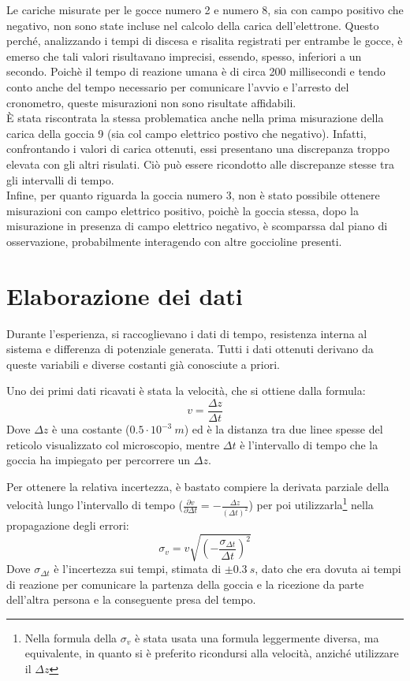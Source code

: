 \documentclass{article}
\begin{document}
Le cariche misurate per le gocce numero 2 e numero 8, sia con campo positivo che negativo, non sono state incluse nel calcolo della carica dell'elettrone. Questo perché, analizzando i tempi di discesa e risalita registrati per entrambe le gocce, è emerso che tali valori risultavano imprecisi, essendo, spesso, inferiori a un secondo. Poichè il tempo di reazione umana è di circa 200 millisecondi e tendo conto anche del tempo necessario per comunicare l'avvio e l'arresto del cronometro, queste misurazioni non sono risultate affidabili.\\

È stata riscontrata la stessa problematica anche nella prima misurazione della carica della goccia 9 (sia col campo elettrico postivo che negativo). Infatti, confrontando i valori di carica ottenuti, essi presentano una discrepanza troppo elevata con gli altri risulati. Ciò può essere ricondotto alle discrepanze stesse tra gli intervalli di tempo.\\

Infine, per quanto riguarda la goccia numero 3, non è stato possibile ottenere misurazioni con campo elettrico positivo, poichè la goccia stessa, dopo la misurazione in presenza di campo elettrico negativo, è scomparssa dal piano di osservazione, probabilmente interagendo con altre goccioline presenti.

\section{Elaborazione dei dati}
Durante l'esperienza, si raccoglievano i dati di tempo, resistenza interna al sistema e differenza di potenziale generata. Tutti i dati ottenuti derivano da queste variabili e diverse costanti già conosciute a priori.

Uno dei primi dati ricavati è stata la velocità, che si ottiene dalla formula:
\begin{equation}
	v=\frac{\Delta z}{\Delta t}
	\label{velocita_limite}
\end{equation}
Dove $\Delta z$ è una costante ($0.5\cdot10^{-3}\ m$) ed è la distanza tra due linee spesse del reticolo visualizzato col microscopio, mentre $\Delta t$ è l'intervallo di tempo che la goccia ha impiegato per percorrere un $\Delta z$.

Per ottenere la relativa incertezza, è bastato compiere la derivata parziale della velocità lungo l'intervallo di tempo ($\frac{\partial v}{\partial \Delta t}=-\frac{\Delta z}{(\Delta t)^2}$) per poi utilizzarla\footnote{Nella formula della $\sigma_v$ è stata usata una formula leggermente diversa, ma equivalente, in quanto si è preferito ricondursi alla velocità, anziché utilizzare il $\Delta z$} nella propagazione degli errori:
\begin{equation}
	\sigma_v=v\sqrt{\left(-\frac{\sigma_{\Delta t}}{\Delta t}\right)^2}
	\label{sigma_v}
\end{equation}
Dove $\sigma_{\Delta t}$ è l'incertezza sui tempi, stimata di $\pm0.3\ s$, dato che era dovuta ai tempi di reazione per comunicare la partenza della goccia e la ricezione da parte dell'altra persona e la conseguente presa del tempo.\\
\end{document}
